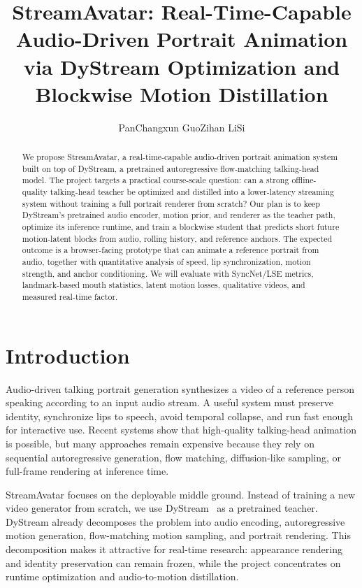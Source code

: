\documentclass{article}
\title{StreamAvatar: Real-Time-Capable Audio-Driven Portrait Animation via DyStream Optimization and Blockwise Motion Distillation}
\author{\normalfont PanChangxun \quad GuoZihan \quad LiSi}
\begin{document}
\maketitle

\begin{abstract}
We propose StreamAvatar, a real-time-capable audio-driven portrait animation system built on top of DyStream, a pretrained autoregressive flow-matching talking-head model. The project targets a practical course-scale question: can a strong offline-quality talking-head teacher be optimized and distilled into a lower-latency streaming system without training a full portrait renderer from scratch? Our plan is to keep DyStream's pretrained audio encoder, motion prior, and renderer as the teacher path, optimize its inference runtime, and train a blockwise student that predicts short future motion-latent blocks from audio, rolling history, and reference anchors. The expected outcome is a browser-facing prototype that can animate a reference portrait from audio, together with quantitative analysis of speed, lip synchronization, motion strength, and anchor conditioning. We will evaluate with SyncNet/LSE metrics, landmark-based mouth statistics, latent motion losses, qualitative videos, and measured real-time factor.
\end{abstract}

\section{Introduction}

Audio-driven talking portrait generation synthesizes a video of a reference person speaking according to an input audio stream. A useful system must preserve identity, synchronize lips to speech, avoid temporal collapse, and run fast enough for interactive use. Recent systems show that high-quality talking-head animation is possible, but many approaches remain expensive because they rely on sequential autoregressive generation, flow matching, diffusion-like sampling, or full-frame rendering at inference time.

StreamAvatar focuses on the deployable middle ground. Instead of training a new video generator from scratch, we use DyStream~\cite{dystream} as a pretrained teacher. DyStream already decomposes the problem into audio encoding, autoregressive motion generation, flow-matching motion sampling, and portrait rendering. This decomposition makes it attractive for real-time research: appearance rendering and identity preservation can remain frozen, while the project concentrates on runtime optimization and audio-to-motion distillation.
\end{document}

